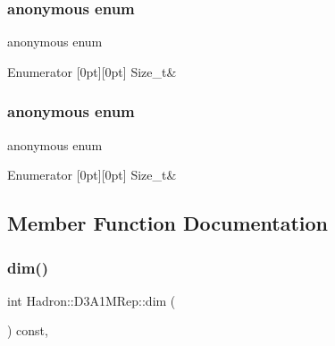 \subsubsection{\texorpdfstring{anonymous enum}{anonymous enum}}
{\footnotesize\ttfamily anonymous enum}

\begin{DoxyEnumFields}{Enumerator}
[0pt][0pt]{}\mbox{\label{structHadron_1_1D3A1MRep_adad907ece6f293e782e5cfb32d9645d2ad08f08a69bbf237ef9b1e9e5fc117854}} 
Size\+\_\+t&\\
\hline

\end{DoxyEnumFields}
\mbox{\label{structHadron_1_1D3A1MRep_adad907ece6f293e782e5cfb32d9645d2}} 
\subsubsection{\texorpdfstring{anonymous enum}{anonymous enum}}
{\footnotesize\ttfamily anonymous enum}

\begin{DoxyEnumFields}{Enumerator}
[0pt][0pt]{}\mbox{\label{structHadron_1_1D3A1MRep_adad907ece6f293e782e5cfb32d9645d2ad08f08a69bbf237ef9b1e9e5fc117854}} 
Size\+\_\+t&\\
\hline

\end{DoxyEnumFields}


\subsection{Member Function Documentation}
\mbox{\label{structHadron_1_1D3A1MRep_a312d820f56c251d8c64adff115dd1c50}} 
\subsubsection{\texorpdfstring{dim()}{dim()}\hspace{0.1cm}{\footnotesize\ttfamily [1/2]}}
{\footnotesize\ttfamily int Hadron\+::\+D3\+A1\+M\+Rep\+::dim (\begin{DoxyParamCaption}{ }\end{DoxyParamCaption}) const\hspace{0.3cm}{\ttfamily [inline]}, {\ttfamily [virtual]}}

